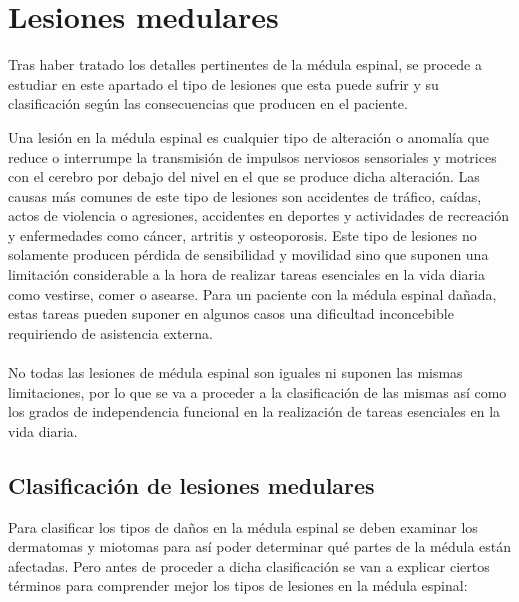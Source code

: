 \section{Lesiones medulares}
Tras haber tratado los detalles pertinentes de la médula espinal, se procede a estudiar en este apartado el tipo de lesiones que esta puede sufrir y su clasificación según las consecuencias que producen en el paciente.

Una lesión en la médula espinal es cualquier tipo de alteración o anomalía que reduce o interrumpe la transmisión de impulsos nerviosos sensoriales y motrices con el cerebro por debajo del nivel en el que se produce dicha alteración\cite{sci_clasificacion}. Las causas más comunes de este tipo de lesiones son accidentes de tráfico, caídas, actos de violencia o agresiones, accidentes en deportes y actividades de recreación y enfermedades como cáncer, artritis y osteoporosis\cite{causas_sci}. Este tipo de lesiones no solamente producen pérdida de sensibilidad y movilidad sino que suponen una limitación considerable a la hora de realizar tareas esenciales en la vida diaria como vestirse, comer o asearse. Para un paciente con la médula espinal dañada, estas tareas pueden suponer en algunos casos una dificultad inconcebible requiriendo de asistencia externa.
\\
\\
No todas las lesiones de médula espinal son iguales ni suponen las mismas limitaciones, por lo que se va a proceder a la clasificación de las mismas así como los grados de independencia funcional en la realización de tareas esenciales en la vida diaria.


\subsection{Clasificación de lesiones medulares}\label{clasificacion_lesiones}
Para clasificar los tipos de daños en la médula espinal se deben examinar los dermatomas y miotomas para así poder determinar qué partes de la médula están afectadas. Pero antes de proceder a dicha clasificación se van a explicar ciertos términos para comprender mejor los tipos de lesiones en la médula espinal\cite{sci_clasificacion}:

